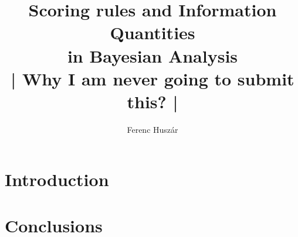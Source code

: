 \documentclass[12pt]{book}
\title{Scoring rules and Information Quantities\\in Bayesian Analysis \\ | Why I am never going to submit this? |}
\author{Ferenc Husz\'{a}r}
\makeatletter
\newcommand{\ChapterOutsidePart}{%
   \def\toclevel@chapter{-1}\def\toclevel@section{0}\def\toclevel@subsection{1}}
\newcommand{\ChapterInsidePart}{%
   \def\toclevel@chapter{0}\def\toclevel@section{1}\def\toclevel@subsection{2}}
\makeatother
\begin{document}
\maketitle

\ChapterOutsidePart 
{}
\tableofcontents

\chapter{Introduction}


\ChapterInsidePart




\ChapterOutsidePart
\chapter{Conclusions}

\lipsum[1]



\end{document}
